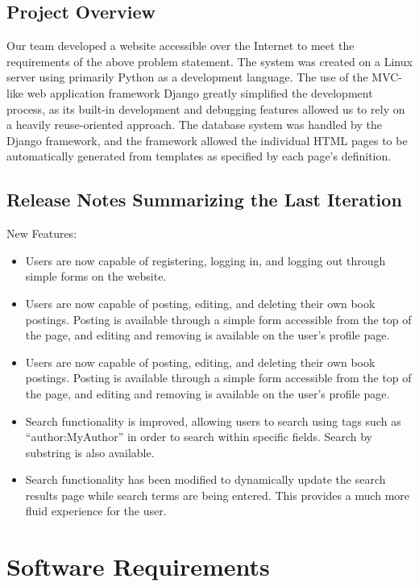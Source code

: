 \documentclass[11pt]{article}
\begin{document}
\subsection{Project Overview}
\label{sec:project-overview}

Our team developed a website accessible over the Internet to meet the
requirements of the above problem statement. The system was created on
a Linux server using primarily Python as a development language. The
use of the MVC-like web application framework Django greatly
simplified the development process, as its built-in development and
debugging features allowed us to rely on a heavily reuse-oriented
approach. The database system was handled by the Django framework, and
the framework allowed the individual HTML pages to be automatically
generated from templates as specified by each page’s definition.


\subsection{Release Notes Summarizing the Last Iteration}
\label{sec:release-notes}

New Features:

\begin{itemize}
\item Users are now capable of registering, logging in, and logging
  out through simple forms on the website.
\item Users are now capable of posting, editing, and deleting their
  own book postings. Posting is available through a simple form
  accessible from the top of the page, and editing and removing is
  available on the user’s profile page.
\item Users are now capable of posting, editing, and deleting their
  own book postings. Posting is available through a simple form
  accessible from the top of the page, and editing and removing is
  available on the user’s profile page.
\item Search functionality is improved, allowing users to search using
  tags such as ``author:MyAuthor'' in order to search within specific
  fields. Search by substring is also available.
\item Search functionality has been modified to dynamically update the
  search results page while search terms are being entered. This
  provides a much more fluid experience for the user.
\end{itemize}


\newpage
\section{Software Requirements}
\label{sec:software-reqs}
\end{document}
